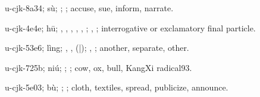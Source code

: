 \begin{multicols}{2}
{\cjkgGlue{}u-cjk-8a34; sù; \cjkgGlue{}\cjkgGlue{}\cjkgGlue{}; \cjkgGlue{}; accuse, sue, inform, narrate.

\cjkgGlue{}u-cjk-4e4e; hū; \cjkgGlue{}, \cjkgGlue{}, \cjkgGlue{}, \cjkgGlue{}, \cjkgGlue{}, \cjkgGlue{}; \cjkgGlue{}, \cjkgGlue{}; interrogative or exclamatory final particle.

\cjkgGlue{}u-cjk-53e6; lìng; \cjkgGlue{}\cjkgGlue{}\cjkgGlue{}, \cjkgGlue{}\cjkgGlue{}\cjkgGlue{}, \cjkgGlue{}\cjkgGlue{}(\cjkgGlue{}|\cjkgGlue{}); \cjkgGlue{}, \cjkgGlue{}; another, separate, other.

\cjkgGlue{}u-cjk-725b; niú; \cjkgGlue{}; \cjkgGlue{}; cow, ox, bull, KangXi radical93.

\cjkgGlue{}u-cjk-5e03; bù; \cjkgGlue{}; \cjkgGlue{}; cloth, textiles, spread, publicize, announce.

}
\end{multicols}
